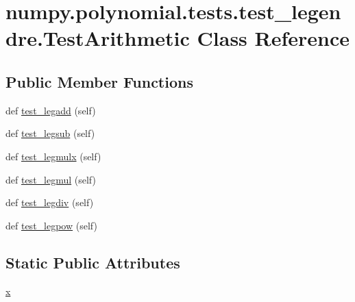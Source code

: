 \hypertarget{classnumpy_1_1polynomial_1_1tests_1_1test__legendre_1_1TestArithmetic}{}\section{numpy.\+polynomial.\+tests.\+test\+\_\+legendre.\+Test\+Arithmetic Class Reference}
\label{classnumpy_1_1polynomial_1_1tests_1_1test__legendre_1_1TestArithmetic}
\subsection*{Public Member Functions}
\begin{DoxyCompactItemize}
\item 
def \hyperlink{classnumpy_1_1polynomial_1_1tests_1_1test__legendre_1_1TestArithmetic_a48bbb888e94014b7f0335706a6d303d0}{test\+\_\+legadd} (self)
\item 
def \hyperlink{classnumpy_1_1polynomial_1_1tests_1_1test__legendre_1_1TestArithmetic_a0dc72fa6132e493cef7855cc36a875ff}{test\+\_\+legsub} (self)
\item 
def \hyperlink{classnumpy_1_1polynomial_1_1tests_1_1test__legendre_1_1TestArithmetic_ae2d547ba59477ed2f1269114640b3d6a}{test\+\_\+legmulx} (self)
\item 
def \hyperlink{classnumpy_1_1polynomial_1_1tests_1_1test__legendre_1_1TestArithmetic_aca42e33a5c98aeb130e355fbb53f7bda}{test\+\_\+legmul} (self)
\item 
def \hyperlink{classnumpy_1_1polynomial_1_1tests_1_1test__legendre_1_1TestArithmetic_aadd960dcf8a7287d03e831d0820fa21d}{test\+\_\+legdiv} (self)
\item 
def \hyperlink{classnumpy_1_1polynomial_1_1tests_1_1test__legendre_1_1TestArithmetic_a08c332f634f5fd3828161355488a363d}{test\+\_\+legpow} (self)
\end{DoxyCompactItemize}
\subsection*{Static Public Attributes}
\begin{DoxyCompactItemize}
\item 
\hyperlink{classnumpy_1_1polynomial_1_1tests_1_1test__legendre_1_1TestArithmetic_a3dbebea6e688842d6750538042376dec}{x}
\end{DoxyCompactItemize}


